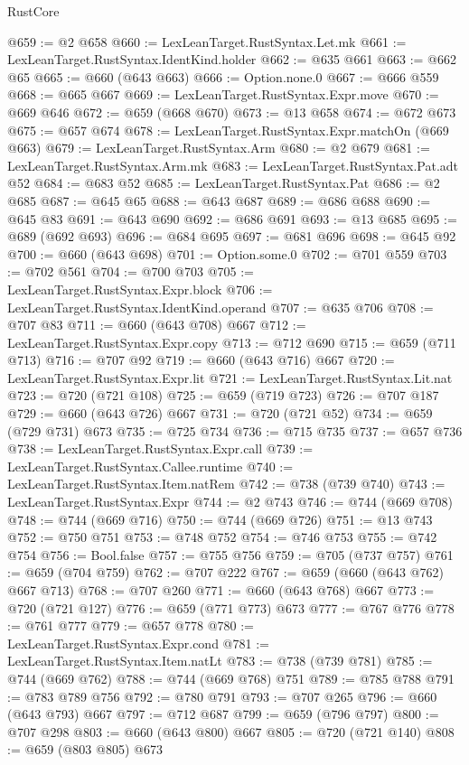 \begin{lexlean}{RustCore}
\begin{coremodule}
@659 := @2 @658
@660 := LexLeanTarget.RustSyntax.Let.mk
@661 := LexLeanTarget.RustSyntax.IdentKind.holder
@662 := @635 @661
@663 := @662 @65
@665 := @660 (@643 @663)
@666 := Option.none.{0}
@667 := @666 @559
@668 := @665 @667
@669 := LexLeanTarget.RustSyntax.Expr.move
@670 := @669 @646
@672 := @659 (@668 @670)
@673 := @13 @658
@674 := @672 @673
@675 := @657 @674
@678 := LexLeanTarget.RustSyntax.Expr.matchOn (@669 @663)
@679 := LexLeanTarget.RustSyntax.Arm
@680 := @2 @679
@681 := LexLeanTarget.RustSyntax.Arm.mk
@683 := LexLeanTarget.RustSyntax.Pat.adt @52
@684 := @683 @52
@685 := LexLeanTarget.RustSyntax.Pat
@686 := @2 @685
@687 := @645 @65
@688 := @643 @687
@689 := @686 @688
@690 := @645 @83
@691 := @643 @690
@692 := @686 @691
@693 := @13 @685
@695 := @689 (@692 @693)
@696 := @684 @695
@697 := @681 @696
@698 := @645 @92
@700 := @660 (@643 @698)
@701 := Option.some.{0}
@702 := @701 @559
@703 := @702 @561
@704 := @700 @703
@705 := LexLeanTarget.RustSyntax.Expr.block
@706 := LexLeanTarget.RustSyntax.IdentKind.operand
@707 := @635 @706
@708 := @707 @83
@711 := @660 (@643 @708) @667
@712 := LexLeanTarget.RustSyntax.Expr.copy
@713 := @712 @690
@715 := @659 (@711 @713)
@716 := @707 @92
@719 := @660 (@643 @716) @667
@720 := LexLeanTarget.RustSyntax.Expr.lit
@721 := LexLeanTarget.RustSyntax.Lit.nat
@723 := @720 (@721 @108)
@725 := @659 (@719 @723)
@726 := @707 @187
@729 := @660 (@643 @726) @667
@731 := @720 (@721 @52)
@734 := @659 (@729 @731) @673
@735 := @725 @734
@736 := @715 @735
@737 := @657 @736
@738 := LexLeanTarget.RustSyntax.Expr.call
@739 := LexLeanTarget.RustSyntax.Callee.runtime
@740 := LexLeanTarget.RustSyntax.Item.natRem
@742 := @738 (@739 @740)
@743 := LexLeanTarget.RustSyntax.Expr
@744 := @2 @743
@746 := @744 (@669 @708)
@748 := @744 (@669 @716)
@750 := @744 (@669 @726)
@751 := @13 @743
@752 := @750 @751
@753 := @748 @752
@754 := @746 @753
@755 := @742 @754
@756 := Bool.false
@757 := @755 @756
@759 := @705 (@737 @757)
@761 := @659 (@704 @759)
@762 := @707 @222
@767 := @659 (@660 (@643 @762) @667 @713)
@768 := @707 @260
@771 := @660 (@643 @768) @667
@773 := @720 (@721 @127)
@776 := @659 (@771 @773) @673
@777 := @767 @776
@778 := @761 @777
@779 := @657 @778
@780 := LexLeanTarget.RustSyntax.Expr.cond
@781 := LexLeanTarget.RustSyntax.Item.natLt
@783 := @738 (@739 @781)
@785 := @744 (@669 @762)
@788 := @744 (@669 @768) @751
@789 := @785 @788
@791 := @783 @789 @756
@792 := @780 @791
@793 := @707 @265
@796 := @660 (@643 @793) @667
@797 := @712 @687
@799 := @659 (@796 @797)
@800 := @707 @298
@803 := @660 (@643 @800) @667
@805 := @720 (@721 @140)
@808 := @659 (@803 @805) @673

\end{coremodule}
\end{lexlean}

